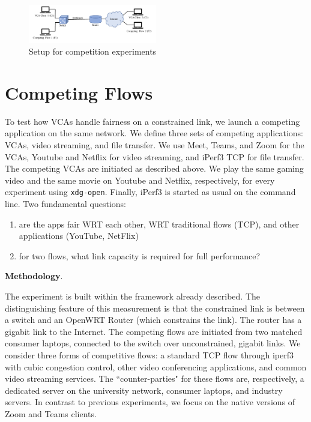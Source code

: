 \begin{figure}[t]
   \centering
    \includegraphics[width=0.5\textwidth,keepaspectratio]{../figures/methodology/competition-setup.pdf}
    \caption{Setup for competition experiments}
    \label{fig:loss_latency}
\end{figure}

\section{Competing Flows}
To test how VCAs handle fairness on a constrained link, we launch a competing application on the same network. We define three sets of competing applications: VCAs, video streaming, and file transfer. We use Meet, Teams, and Zoom for the VCAs, Youtube and Netflix for video streaming, and iPerf3 TCP for file transfer. The competing VCAs are initiated as described above. We play the same gaming video and the same movie on Youtube and Netflix, respectively, for every experiment using \texttt{xdg-open}. Finally, iPerf3 is started as usual on the command line.
Two fundamental questions:
\begin{enumerate}
    \item are the apps fair WRT each other, WRT traditional flows (TCP), and other applications (YouTube, NetFlix)
    \item for two flows, what link capacity is required for full performance?
\end{enumerate}


\noindent \textbf{Methodology}.



The experiment is built within the framework already described.
The distinguishing feature of this measurement is that the 
  constrained link is between a switch and an OpenWRT Router 
    (which constrains the link).
The router has a gigabit link to the Internet.
The competing flows are initiated from two matched consumer laptops,
  connected to the switch over unconstrained, gigabit links.
We consider three forms of competitive flows:
  a standard TCP flow through iperf3 with cubic congestion control,
  other video conferencing applications, and 
  common video streaming services.
The ``counter-parties" for these flows are, respectively,
  a dedicated server on the university network,
  consumer laptops, and industry servers.
In contrast to previous experiments, 
  we focus on the native versions of Zoom and Teams clients.

